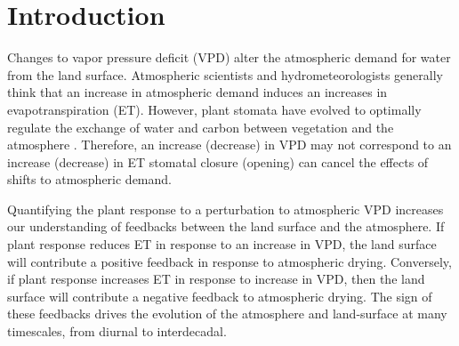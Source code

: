 \documentclass[draft,linenumbers]{agujournal}
\begin{document}

%
% 
% 
% 


\section{Introduction}

Changes to vapor pressure deficit (VPD) alter the atmospheric demand for water from the land surface. Atmospheric scientists and hydrometeorologists generally think that an increase in atmospheric demand induces an increases in evapotranspiration (ET). However, plant stomata have evolved to optimally regulate the exchange of water and carbon between vegetation and the atmosphere \citep{Franks_2017}. Therefore, an increase (decrease) in VPD may not correspond to an increase (decrease) in ET stomatal closure (opening) can cancel the effects of shifts to atmospheric demand.

Quantifying the plant response to a perturbation to atmospheric VPD increases our understanding of feedbacks between the land surface and the atmosphere. If plant response reduces ET in response to an increase in VPD, the land surface will contribute a positive feedback in response to atmospheric drying. Conversely, if plant response increases ET in response to increase in VPD, then the land surface will contribute a negative feedback to atmospheric drying. The sign of these feedbacks drives the evolution of the atmosphere and land-surface at many timescales, from diurnal to interdecadal. 
\end{document}

